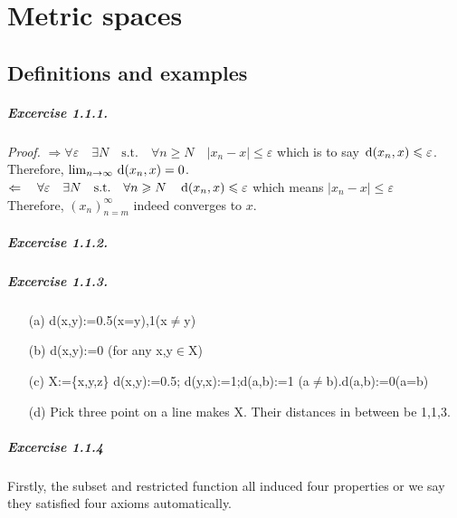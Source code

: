 
\chapter{Metric spaces}
\section{Definitions and examples}
	\paragraph{\it Excercise 1.1.1.}{\it Proof.} $\Rightarrow \forall\varepsilon \quad\exists N\quad\text{s.t.} \quad\forall n \geqslant N\quad |x_{n}-x| \leqslant\varepsilon$ which is to say $\,\mathrm{d} (x_{n},x) \leqslant \varepsilon$. Therefore, $\lim_{n\rightarrow\infty}\,\mathrm{d}(x_{n},x)=0$.\\
	
	$\Leftarrow \quad \forall\varepsilon \quad\exists N\quad\text{s.t.} \quad\forall n \geqslant N\quad \,\mathrm{d}(x_{n},x)\leqslant\varepsilon $ which means $ |x_{n}-x| \leqslant\varepsilon$\\Therefore, $(x_{n})_{n=m}^{\infty}$ indeed converges to $x$.

\paragraph{\it Excercise 1.1.2.}

\paragraph{\it Excercise 1.1.3.}
\begin{itemize}
\item[(a)]d(x,y):=0.5(x=y),1(x$\neq$y)
\item[(b)]d(x,y):=0 (for any x,y$\in$X)
\item[(c)]X:=\{x,y,z\}  d(x,y):=0.5; d(y,x):=1;d(a,b):=1 (a$\neq$b).d(a,b):=0(a=b)
\item[(d)]Pick three point on a line makes X. Their distances in between be 1,1,3.

\end{itemize}


\paragraph{Excercise 1.1.4}
Firstly, the subset and restricted function all induced four properties or we say they satisfied four axioms automatically.

